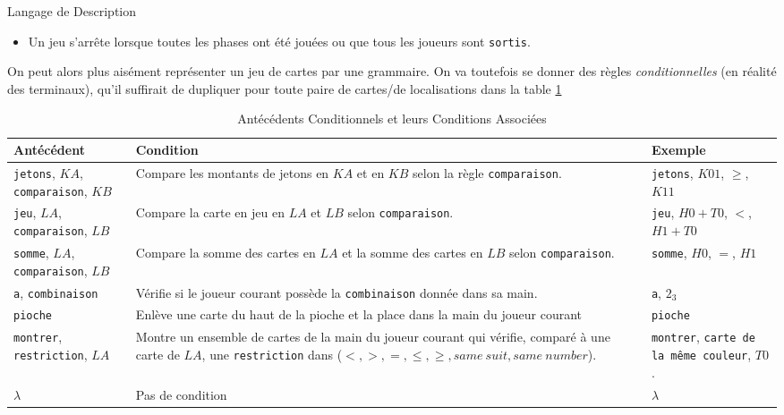 \documentclass{cours}
\begin{document}
\begin{définition}{Langage de Description}{}
\begin{itemize}
\begin{enumerate}
            \item Il est \texttt{sorti} du jeu, il a perdu la partie et ne peut plus jouer\footnote{Dommage pour lui...}.
            \item Il a \texttt{gagné} la partie, auquel cas la partie s'arrête.
        \end{enumerate}
        Une phase se termine lorsque tous les joueurs ont \texttt{fini} ou sont \texttt{sortis}. Tant qu'il reste des joueurs à la \texttt{suite}, on reboucle sur la liste des joueurs. 
        \item Un jeu s'arrête lorsque toutes les phases ont été jouées ou que tous les joueurs sont \texttt{sortis}.
    \end{itemize}    
\end{définition}

On peut alors plus aisément représenter un jeu de cartes par une grammaire. On va toutefois se donner des règles \textit{conditionnelles} (en réalité des terminaux), qu'il suffirait de dupliquer pour toute paire de cartes/de localisations dans la table \ref{table:code_ant}
\begin{table}
    \caption{Antécédents Conditionnels et leurs Conditions Associées}
    \begin{tabular}{>{\centering}m{.2\linewidth}>{\centering}m{.5\linewidth}>{\centering\arraybackslash}m{.2\linewidth}}
        \toprule 
        Antécédent & Condition & Exemple\\
        \midrule \midrule
        \texttt{jetons}, $KA$, \texttt{comparaison}, $KB$ & Compare les montants de jetons en $KA$ et en $KB$ selon la règle \texttt{comparaison}. & \texttt{jetons}, $K01$, $\geq$, $K11$\\
        \midrule
        \texttt{jeu}, $LA$, \texttt{comparaison}, $LB$ & Compare la carte en jeu en $LA$ et $LB$ selon \texttt{comparaison}. & \texttt{jeu}, $H0 + T0$, $<$, $H1 + T0$\\
        \midrule
        \texttt{somme}, $LA$, \texttt{comparaison}, $LB$ & Compare la somme des cartes en $LA$ et la somme des cartes en $LB$ selon \texttt{comparaison}. & \texttt{somme}, $H0$, $=$, $H1$\\
        \midrule 
        \texttt{a}, \texttt{combinaison} & Vérifie si le joueur courant possède la \texttt{combinaison} donnée dans sa main. & \texttt{a}, $2_{3}$\\
        \midrule 
        \texttt{pioche} & Enlève une carte du haut de la pioche et la place dans la main du joueur courant & \texttt{pioche}\\
        \midrule
        \texttt{montrer}, \texttt{restriction}, $LA$ & Montre un ensemble de cartes de la main du joueur courant qui vérifie, comparé à une carte de $LA$, une \texttt{restriction} dans ($<, >, =, \leq, \geq, same \ suit, same \ number$). & \texttt{montrer}, \texttt{carte de la même couleur}, $T0$.\\
        \midrule
        $\lambda$ & Pas de condition & $\lambda$\\
        \bottomrule  
    \end{tabular}
    \label{table:code_ant}
\end{table}
\end{document}
